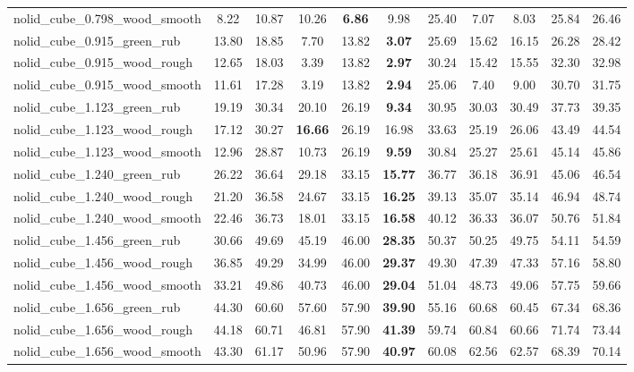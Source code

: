 \begin{table}[H]
{\begin{tabular}{l cccccccccc}
        nolid\_cube\_0.798\_wood\_smooth & 8.22 & 10.87 & 10.26 & \textbf{6.86} & 9.98 & 25.40 & 7.07 & 8.03 & 25.84 & 26.46 \\
        nolid\_cube\_0.915\_green\_rub & 13.80 & 18.85 & 7.70 & 13.82 & \textbf{3.07} & 25.69 & 15.62 & 16.15 & 26.28 & 28.42 \\
        nolid\_cube\_0.915\_wood\_rough & 12.65 & 18.03 & 3.39 & 13.82 & \textbf{2.97} & 30.24 & 15.42 & 15.55 & 32.30 & 32.98 \\
        nolid\_cube\_0.915\_wood\_smooth & 11.61 & 17.28 & 3.19 & 13.82 & \textbf{2.94} & 25.06 & 7.40 & 9.00 & 30.70 & 31.75 \\
        nolid\_cube\_1.123\_green\_rub & 19.19 & 30.34 & 20.10 & 26.19 & \textbf{9.34} & 30.95 & 30.03 & 30.49 & 37.73 & 39.35 \\
        nolid\_cube\_1.123\_wood\_rough & 17.12 & 30.27 & \textbf{16.66} & 26.19 & 16.98 & 33.63 & 25.19 & 26.06 & 43.49 & 44.54 \\
        nolid\_cube\_1.123\_wood\_smooth & 12.96 & 28.87 & 10.73 & 26.19 & \textbf{9.59} & 30.84 & 25.27 & 25.61 & 45.14 & 45.86 \\
        nolid\_cube\_1.240\_green\_rub & 26.22 & 36.64 & 29.18 & 33.15 & \textbf{15.77} & 36.77 & 36.18 & 36.91 & 45.06 & 46.54 \\
        nolid\_cube\_1.240\_wood\_rough & 21.20 & 36.58 & 24.67 & 33.15 & \textbf{16.25} & 39.13 & 35.07 & 35.14 & 46.94 & 48.74 \\
        nolid\_cube\_1.240\_wood\_smooth & 22.46 & 36.73 & 18.01 & 33.15 & \textbf{16.58} & 40.12 & 36.33 & 36.07 & 50.76 & 51.84 \\
        nolid\_cube\_1.456\_green\_rub & 30.66 & 49.69 & 45.19 & 46.00 & \textbf{28.35} & 50.37 & 50.25 & 49.75 & 54.11 & 54.59 \\
        nolid\_cube\_1.456\_wood\_rough & 36.85 & 49.29 & 34.99 & 46.00 & \textbf{29.37} & 49.30 & 47.39 & 47.33 & 57.16 & 58.80 \\
        nolid\_cube\_1.456\_wood\_smooth & 33.21 & 49.86 & 40.73 & 46.00 & \textbf{29.04} & 51.04 & 48.73 & 49.06 & 57.75 & 59.66 \\
        nolid\_cube\_1.656\_green\_rub & 44.30 & 60.60 & 57.60 & 57.90 & \textbf{39.90} & 55.16 & 60.68 & 60.45 & 67.34 & 68.36 \\
        nolid\_cube\_1.656\_wood\_rough & 44.18 & 60.71 & 46.81 & 57.90 & \textbf{41.39} & 59.74 & 60.84 & 60.66 & 71.74 & 73.44 \\
        nolid\_cube\_1.656\_wood\_smooth & 43.30 & 61.17 & 50.96 & 57.90 & \textbf{40.97} & 60.08 & 62.56 & 62.57 & 68.39 & 70.14 \\

\end{tabular}}
\end{table}
